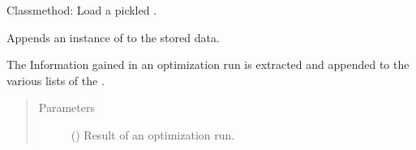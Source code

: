 \documentclass[letterpaper,10pt,english]{sphinxmanual}
\begin{document}
\begin{fulllineitems}
\begin{fulllineitems}
\end{fulllineitems}


\begin{fulllineitems}
\label{\detokenize{qsim:qsim.data_container.DataContainer.from_pickle}}
Classmethod: Load a pickled .

\end{fulllineitems}


\begin{fulllineitems}
\label{\detokenize{qsim:id10}}
Appends an instance of  to the stored data.

The Information gained in an optimization run is extracted and
appended to the various lists of the .
\begin{quote}\begin{description}
\item[{Parameters}] \leavevmode
{} () \textendash{} Result of an optimization run.

\end{description}\end{quote}

\end{fulllineitems}


\begin{fulllineitems}
\label{\detokenize{qsim:qsim.data_container.DataContainer.check_length}}~
\end{fulllineitems}


\end{fulllineitems}
\end{document}
